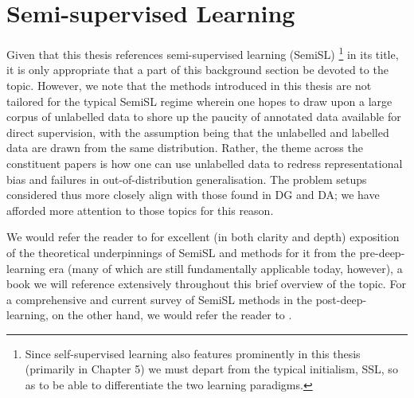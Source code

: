 \section{ Semi-supervised Learning }\label{sec:semisl}
Given that this thesis references semi-supervised learning (SemiSL)
%
\footnote{ Since self-supervised learning also features prominently in this thesis (primarily in
Chapter 5) we must depart from the typical initialism, SSL, so as to be able to differentiate the
two learning paradigms. }
%
in its title, it is only appropriate that a part of this background section be devoted to the
topic.
%
However, we note that the methods introduced in this thesis are not tailored for the typical SemiSL
regime wherein one hopes to draw upon a large corpus of unlabelled data to shore up the paucity of
annotated data available for direct supervision, with the assumption being that the unlabelled and
labelled data are drawn from the same distribution.
%
Rather, the theme across the constituent papers is how one can use unlabelled data to redress
representational bias and failures in out-of-distribution generalisation. 
%
The problem setups considered thus more closely align with those found in DG and DA; we have
afforded more attention to those topics for this reason.

We would refer the reader to \cite{chapelle2009semi} for excellent (in both clarity and depth)
exposition of the theoretical underpinnings of SemiSL and methods for it from the pre-deep-learning
era (many of which are still fundamentally applicable today, however), a book we will reference
extensively throughout this brief overview of the topic.
%
For a comprehensive and current survey of SemiSL methods in the post-deep-learning, on the other
hand, we would refer the reader to \cite{yang2022survey}.
%

